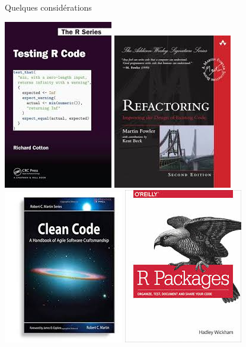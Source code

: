 \documentclass[11pt]{beamer}
\begin{document}
\begin{frame}{Quelques considérations}

\includegraphics[height=0.25\textheight]{testingRcode} \hfill
\includegraphics[height=0.25\textheight]{refactoring} \hfill
\includegraphics[height=0.25\textheight]{cleanCode} \hfill
\includegraphics[height=0.25\textheight]{packages} \hfill

\end{frame}
\end{document}
